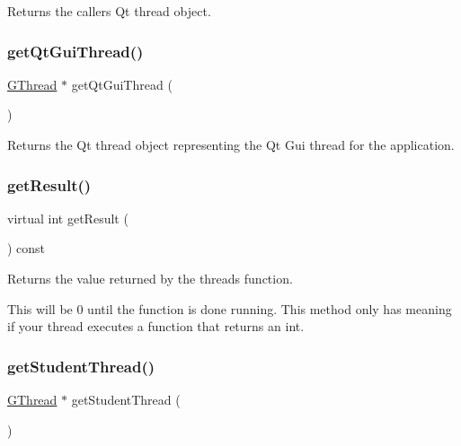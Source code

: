 Returns the caller\textquotesingle{}s Qt thread object. 

\mbox{\label{classsgl_1_1GThread_ac141b7dd2d0dfa84f52db332569623fc}} 
\subsubsection{\texorpdfstring{get\+Qt\+Gui\+Thread()}{getQtGuiThread()}}
{\footnotesize\ttfamily \mbox{\hyperlink{classsgl_1_1GThread}{G\+Thread}} $\ast$ get\+Qt\+Gui\+Thread (\begin{DoxyParamCaption}{ }\end{DoxyParamCaption})\hspace{0.3cm}{\ttfamily [static]}}



Returns the Qt thread object representing the Qt Gui thread for the application. 

\mbox{\label{classsgl_1_1GThread_a6cfc0f4e3b2174fde084cd1865f2c9e9}} 
\subsubsection{\texorpdfstring{get\+Result()}{getResult()}}
{\footnotesize\ttfamily virtual int get\+Result (\begin{DoxyParamCaption}{ }\end{DoxyParamCaption}) const\hspace{0.3cm}{\ttfamily [pure virtual]}}



Returns the value returned by the thread\textquotesingle{}s function. 

This will be 0 until the function is done running. This method only has meaning if your thread executes a function that returns an int. \mbox{\label{classsgl_1_1GThread_ae3c433f1db9de03fe8a6aa83dbc689ed}} 
\subsubsection{\texorpdfstring{get\+Student\+Thread()}{getStudentThread()}}
{\footnotesize\ttfamily \mbox{\hyperlink{classsgl_1_1GThread}{G\+Thread}} $\ast$ get\+Student\+Thread (\begin{DoxyParamCaption}{ }\end{DoxyParamCaption})\hspace{0.3cm}{\ttfamily [static]}}



